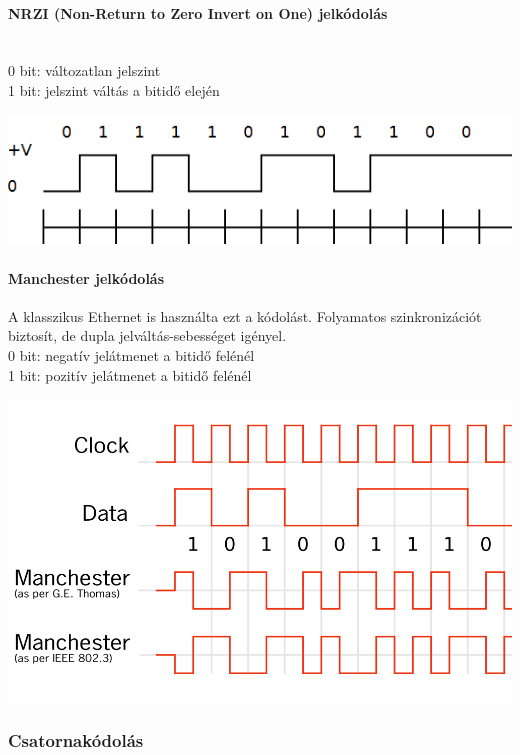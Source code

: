 \begin{multicols}{2}
\paragraph{NRZI (Non-Return to Zero Invert on One) jelkódolás}~\\
0 bit: változatlan jelszint\\
1 bit: jelszint váltás a bitidő elején

\includegraphics[width=\linewidth]{fig/12-NRZ1}
\end{multicols}

\begin{multicols}{2}
\paragraph{Manchester jelkódolás} A klasszikus Ethernet is használta ezt a kódolást. Folyamatos szinkronizációt biztosít, de dupla jelváltás-sebességet igényel.\\
0 bit: negatív jelátmenet a bitidő felénél\\
1 bit: pozitív jelátmenet a bitidő felénél

\includegraphics[width=\linewidth]{fig/12_Manchester}
\end{multicols}

\subsubsection{Csatornakódolás}


